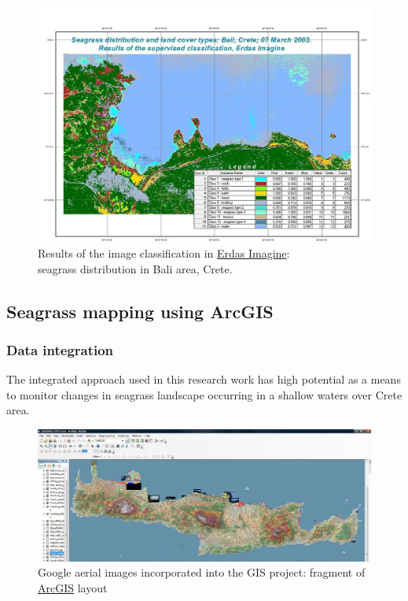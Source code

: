 \documentclass[10pt, a4paper]{article}
\begin{document}
\begin{figure}
	\begin{center}
		\includegraphics[scale=0.40]{Fig-36.jpg}
		\caption{Results of the image classification in \href{http://www.erdas.com/products/ERDASIMAGINE/ERDASIMAGINE/Details.aspx}{Erdas Imagine}: \\ seagrass distribution in Bali area, Crete. }
		\label{fig:39}
	\end{center}
\end{figure}

\subsection{Seagrass mapping using ArcGIS}

\subsubsection{Data integration}
The integrated approach used in this research work has high potential as a means to monitor changes
in seagrass landscape occurring in a shallow waters over Crete area.

\begin{figure}
	\begin{center}
		\includegraphics[scale=0.25]{Fig-37.jpg}
		\caption{Google aerial images incorporated into the GIS project: fragment of \href{http://www.esri.com/software/arcgis/index.html}{ArcGIS} layout}
		\label{fig:4.17}
	\end{center}
\end{figure}
\end{document}
